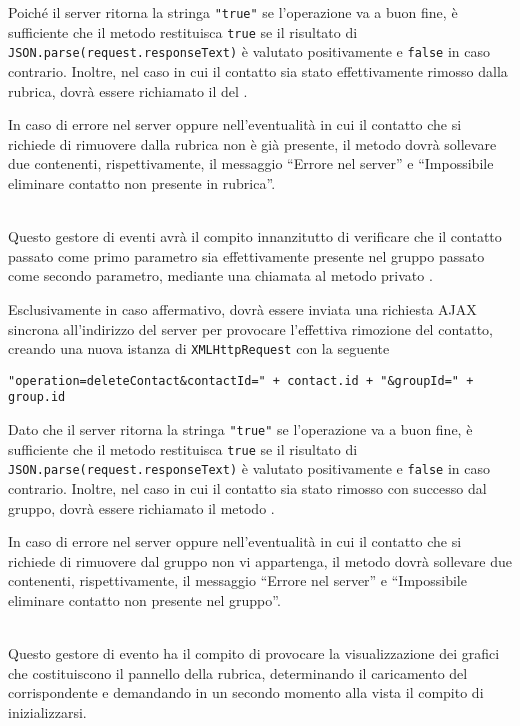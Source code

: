 \begin{description}
Poiché il server ritorna la stringa \verb'"true"' se l'operazione va a buon fine, è sufficiente che il metodo restituisca \verb'true' se il risultato di \verb'JSON.parse(request.responseText)' è valutato positivamente e \texttt{false} in caso contrario. Inoltre, nel caso in cui il contatto sia stato effettivamente rimosso dalla rubrica, dovrà essere richiamato il  del .

In caso di errore nel server oppure nell'eventualità in cui il contatto che si richiede di rimuovere dalla rubrica non è già presente, il metodo dovrà sollevare due  contenenti, rispettivamente, il messaggio ``Errore nel server'' e ``Impossibile eliminare contatto non presente in rubrica''.

\item{}\\
Questo gestore di eventi avrà il compito innanzitutto di verificare che il contatto passato come primo parametro sia effettivamente presente nel gruppo passato come secondo parametro, mediante una chiamata al metodo privato .

Esclusivamente in caso affermativo, dovrà essere inviata una richiesta AJAX sincrona all'indirizzo del server per provocare l'effettiva rimozione del contatto, creando una nuova istanza di \verb'XMLHttpRequest' con la seguente 
\begin{verbatim}
"operation=deleteContact&contactId=" + contact.id + "&groupId=" + group.id
\end{verbatim}

Dato che il server ritorna la stringa \verb'"true"' se l'operazione va a buon fine, è sufficiente che il metodo restituisca \verb'true' se il risultato di \verb'JSON.parse(request.responseText)' è valutato positivamente e \verb'false' in caso contrario. Inoltre, nel caso in cui il contatto sia stato rimosso con successo dal gruppo, dovrà essere richiamato il metodo .

In caso di errore nel server oppure nell'eventualità in cui il contatto che si richiede di rimuovere dal gruppo non vi appartenga, il metodo dovrà sollevare due  contenenti, rispettivamente, il messaggio ``Errore nel server'' e ``Impossibile eliminare contatto non presente nel gruppo''.

\item{}\\
Questo gestore di evento ha il compito di provocare la visualizzazione dei  grafici che costituiscono il pannello della rubrica, determinando il caricamento del  corrispondente e demandando in un secondo momento alla vista il compito di inizializzarsi.


\end{description}
